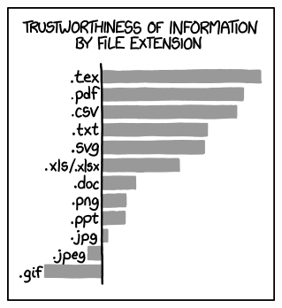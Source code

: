\documentclass[intlimits,twoside,a4paper,11pt]{article}
\begin{document}
\begin{figure}[H]
	\centering
	\begin{subfigure}[t]{70mm} %
		\includegraphics[width=\textwidth]{xkcd1301.png} %
		\label{fig-example-2a}
	\end{subfigure}
	\quad %
	\begin{subfigure}[t]{50mm}

\end{subfigure}
\end{figure}
\end{document}
